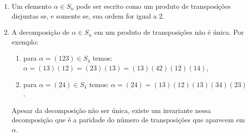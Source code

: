 \begin{observacoes}
	\begin{enumerate}[label=({\arabic*})]
		\item Um elemento $\alpha \in S_n$ pode ser escrito como um produto de transposi\c{c}\~oes disjuntas se, e somente se, sua ordem for igual a 2.

		\item A decomposi\c{c}\~ao de $\alpha \in S_n$ em um produto de transposi\c{c}\~oes n\~ao \'e \'unica. Por exemplo:
		\begin{enumerate}
			\item para $\alpha = (123) \in S_4$ temos: $\alpha = (13)(12) = (23)(13) = (13)(42)(12)(14)$,
			\item para $\alpha = (24) \in S_4$ temos: $\alpha = (24) = (13)(12)(13)(34)(23)$.
		\end{enumerate}
		Apesar da decomposi\c{c}\~ao n\~ao ser \'unica, existe um invariante nessa decomposi\c{c}\~ao que \'e a paridade do n\'umero de transposi\c{c}\~oes que aparecem em $\alpha$.
	\end{enumerate}
\end{observacoes}

